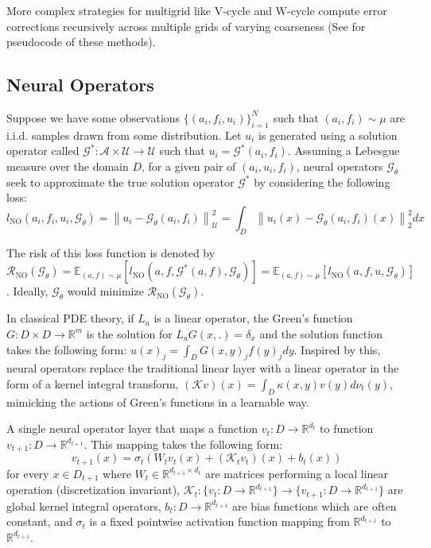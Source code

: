 \documentclass[12pt]{article}
\begin{document}
More complex strategies for multigrid like V-cycle and W-cycle compute error corrections recursively across multiple grids of varying coarseness (See  for pseudocode of these methods).



\subsection{Neural Operators} \label{sec:neuraloperators}

Suppose we have some observations $\{(a_i, f_i, u_i)\}_{i = 1}^N$ such that $(a_i, f_i) \sim \mu$ are i.i.d. samples drawn from some distribution. Let $u_i$ is generated using a solution operator called $\mathcal{G}^{*} : \mathcal{A} \times \mathcal{U} \to \mathcal{U}$ such that $u_i = \mathcal{G}^{*}(a_i, f_i)$. Assuming a Lebesgue measure over the domain $D$, for a given pair of $(a_i, u_i, f_i)$, neural operators  $\mathcal{G}_{\theta}$ seek to approximate the true solution operator $\mathcal{G}^*$ by considering the following loss:
\begin{equation} \label{eq:NOloss}
    l_{\text{NO}}(a_i, f_i, u_i, \mathcal{G}_{\theta}) = \left\|u_i - \mathcal{G}_{\theta}(a_i, f_i)\right\|^2_{\mathcal{U}} = \int_{D} \left\|u_i(x) - \mathcal{G}_{\theta}(a_i, f_i)(x)\right\|_2^2dx
\end{equation}

The risk of this loss function is denoted by $\mathcal{R}_{\text{NO}}(\mathcal{G}_{\theta}) = \mathbb{E}_{(a, f) \sim \mu}\left[l_{\text{NO}}(a, f, \mathcal{G}^{*}(a, f), \mathcal{G}_{\theta})\right] = \mathbb{E}_{(a, f) \sim \mu}\left[l_{\text{NO}}(a, f, u, \mathcal{G}_{\theta})\right]$. Ideally, $\mathcal{G}_{\theta}$ would minimize $\mathcal{R}_{\text{NO}}(\mathcal{G}_{\theta})$.

In classical PDE theory, if $L_a$ is a linear operator, the Green's function \autocite{stakgold2011greens} $G: D \times D \to \mathbb{R}^m$ is the solution for $L_aG(x, .) = \delta_x$ and the solution function takes the following form: $u(x)_j =\int_D G(x, y)_j f(y)_jdy$. Inspired by this, neural operators \autocite{kovachki2023neural} replace the traditional linear layer with a linear operator in the form of a kernel integral transform, $(\mathcal{K}v)(x) = \int_{D}\kappa(x, y)v(y)d\nu_t(y)$, mimicking the actions of Green's functions in a learnable way. 

A single neural operator layer that maps a function $v_t: D \to \mathbb{R}^{d_t}$ to function $v_{t + 1}: D \to \mathbb{R}^{d_{t + 1}}$. This mapping takes the following form: $$v_{t + 1}(x) = \sigma_t\left(W_tv_t(x) + (\mathcal{K}_tv_t)(x) + b_t(x)\right)$$ for every $x \in D_{t + 1}$ where $W_t \in \mathbb{R}^{d_{t + 1} \times d_{t}}$ are matrices performing a local linear operation (discretization invariant), $\mathcal{K}_t: \{v_t: D \to \mathbb{R}^{d_{t + 1}}\} \to \{v_{t + 1}: D \to \mathbb{R}^{d_{t + 1}}\}$ are global kernel integral operators, $b_t: D \to \mathbb{R}^{d_{t + 1}}$ are bias functions which are often constant, and $\sigma_t$ is a fixed pointwise activation function mapping from $\mathbb{R}^{d_{t + 1}}$ to $\mathbb{R}^{d_{t + 1}}$.
\end{document}
